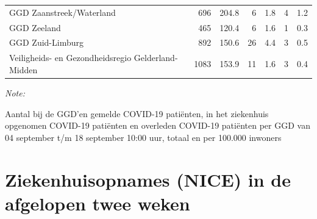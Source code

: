 \documentclass[
  english,
  man,floatsintext]{apa6}
\begin{document}
\begin{table}
\begin{threeparttable}
\begin{tabular}{lrrrrrr}
GGD Zaanstreek/Waterland & 696 & 204.8 & 6 & 1.8 & 4 & 1.2\\
GGD Zeeland & 465 & 120.4 & 6 & 1.6 & 1 & 0.3\\
GGD Zuid-Limburg & 892 & 150.6 & 26 & 4.4 & 3 & 0.5\\
Veiligheids- en Gezondheidsregio Gelderland-Midden & 1083 & 153.9 & 11 & 1.6 & 3 & 0.4\\
\bottomrule
\end{tabular}
\begin{tablenotes}
\item \textit{Note: } 
\item Aantal bij de GGD’en gemelde COVID-19 patiënten, in het ziekenhuis opgenomen COVID-19 patiënten en overleden COVID-19 patiënten per GGD van 04 september t/m 18 september 10:00 uur, totaal en per 100.000 inwoners
\end{tablenotes}
\end{threeparttable}
\endgroup{}
\end{table}

\newpage

\hypertarget{ziekenhuisopnames-nice-in-de-afgelopen-twee-weken}{%
\section{Ziekenhuisopnames (NICE) in de afgelopen twee weken}\label{ziekenhuisopnames-nice-in-de-afgelopen-twee-weken}}
\end{document}
